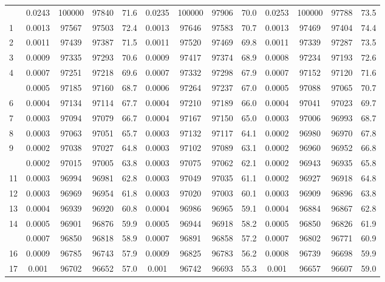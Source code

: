 \documentclass[
  14pt,
]{article}
\begin{document}
\begin{longtable}[t]{lcccccccccccc}
\endfoot
\bottomrule
\endlastfoot
0 & 0.0243 & 100000 & 97840 & 71.6 & 0.0235 & 100000 & 97906 & 70.0 & 0.0253 & 100000 & 97788 & 73.5\\
1 & 0.0013 & 97567 & 97503 & 72.4 & 0.0013 & 97646 & 97583 & 70.7 & 0.0013 & 97469 & 97404 & 74.4\\
2 & 0.0011 & 97439 & 97387 & 71.5 & 0.0011 & 97520 & 97469 & 69.8 & 0.0011 & 97339 & 97287 & 73.5\\
3 & 0.0009 & 97335 & 97293 & 70.6 & 0.0009 & 97417 & 97374 & 68.9 & 0.0008 & 97234 & 97193 & 72.6\\
4 & 0.0007 & 97251 & 97218 & 69.6 & 0.0007 & 97332 & 97298 & 67.9 & 0.0007 & 97152 & 97120 & 71.6\\
\addlinespace
5 & 0.0005 & 97185 & 97160 & 68.7 & 0.0006 & 97264 & 97237 & 67.0 & 0.0005 & 97088 & 97065 & 70.7\\
6 & 0.0004 & 97134 & 97114 & 67.7 & 0.0004 & 97210 & 97189 & 66.0 & 0.0004 & 97041 & 97023 & 69.7\\
7 & 0.0003 & 97094 & 97079 & 66.7 & 0.0004 & 97167 & 97150 & 65.0 & 0.0003 & 97006 & 96993 & 68.7\\
8 & 0.0003 & 97063 & 97051 & 65.7 & 0.0003 & 97132 & 97117 & 64.1 & 0.0002 & 96980 & 96970 & 67.8\\
9 & 0.0002 & 97038 & 97027 & 64.8 & 0.0003 & 97102 & 97089 & 63.1 & 0.0002 & 96960 & 96952 & 66.8\\
\addlinespace
10 & 0.0002 & 97015 & 97005 & 63.8 & 0.0003 & 97075 & 97062 & 62.1 & 0.0002 & 96943 & 96935 & 65.8\\
11 & 0.0003 & 96994 & 96981 & 62.8 & 0.0003 & 97049 & 97035 & 61.1 & 0.0002 & 96927 & 96918 & 64.8\\
12 & 0.0003 & 96969 & 96954 & 61.8 & 0.0003 & 97020 & 97003 & 60.1 & 0.0003 & 96909 & 96896 & 63.8\\
13 & 0.0004 & 96939 & 96920 & 60.8 & 0.0004 & 96986 & 96965 & 59.1 & 0.0004 & 96884 & 96867 & 62.8\\
14 & 0.0005 & 96901 & 96876 & 59.9 & 0.0005 & 96944 & 96918 & 58.2 & 0.0005 & 96850 & 96826 & 61.9\\
\addlinespace
15 & 0.0007 & 96850 & 96818 & 58.9 & 0.0007 & 96891 & 96858 & 57.2 & 0.0007 & 96802 & 96771 & 60.9\\
16 & 0.0009 & 96785 & 96743 & 57.9 & 0.0009 & 96825 & 96783 & 56.2 & 0.0008 & 96739 & 96698 & 59.9\\
17 & 0.001 & 96702 & 96652 & 57.0 & 0.001 & 96742 & 96693 & 55.3 & 0.001 & 96657 & 96607 & 59.0\\

\end{longtable}
\end{document}
